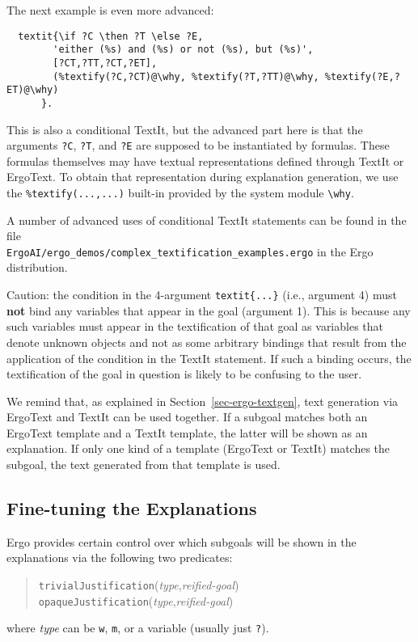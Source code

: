 The next example is even more advanced:
\begin{verbatim}
  textit{\if ?C \then ?T \else ?E,
        'either (%s) and (%s) or not (%s), but (%s)',
        [?CT,?TT,?CT,?ET],
        (%textify(?C,?CT)@\why, %textify(?T,?TT)@\why, %textify(?E,?ET)@\why)
      }.
\end{verbatim}
This is also a conditional TextIt, but the advanced part here is that the
arguments \texttt{?C}, \texttt{?T}, and \texttt{?E} are supposed to be
instantiated by \FLSYSTEM formulas. These formulas themselves may have
textual representations defined through TextIt or ErgoText.
To obtain that representation during explanation generation, we use the
\texttt{\%textify(...,...)} built-in provided by  the system
module \verb|\why|. 

A number of advanced uses of conditional TextIt statements can be found in
the file\\
\texttt{ErgoAI/ergo\_demos/complex\_textification\_examples.ergo}
in the Ergo distribution. 

Caution: the condition in the 4-argument \texttt{textit\{...\}} (i.e.,
argument 4) must
\textbf{not} bind any variables that appear in the goal (argument 1).  
This is because any such variables must appear in the textification of that
goal as variables that denote unknown objects and not as some arbitrary
bindings that result from the application of the
condition in the TextIt statement.
If such a binding occurs, the textification of the goal in question is
likely to be confusing to the user.


We remind that, as explained in Section~\ref{sec-ergo-textgen}, text generation via
ErgoText and TextIt can be used together.
If a subgoal matches both an ErgoText template and a TextIt template,
the latter will be shown as an explanation. If only one kind of a template
(ErgoText or TextIt) matches the subgoal, the text generated from that
template is used.

\subsection{Fine-tuning the Explanations}

Ergo provides certain control over which subgoals will be shown in the
explanations via the following two predicates:
\begin{quote}
    \texttt{\bs{}trivialJustification}(\emph{type},\emph{reified-goal})  
    \\
    \texttt{\bs{}opaqueJustification}(\emph{type},\emph{reified-goal})  
\end{quote}
where \emph{type} can be \texttt{w}, \texttt{m}, or a variable
(usually just \texttt{?}).   

